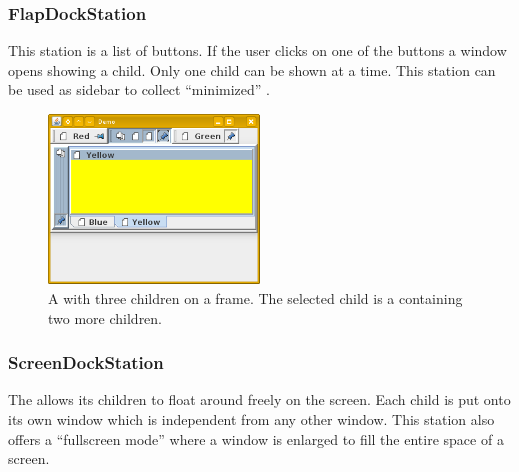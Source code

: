 \subsubsection{FlapDockStation}
This station is a list of buttons. If the user clicks on one of the buttons a window opens showing a child. Only one child can be shown at a time. This station can be used as sidebar to collect ``minimized'' . 

\begin{figure}[h!]
  \centering
    \includegraphics[width=0.5\textwidth]{basics/FlapDockStation}
  \caption{A  with three children on a frame. The selected child is a  containing two more children.}
\end{figure}


\subsubsection{ScreenDockStation}
The  allows its children to float around freely on the screen. Each child is put onto its own window which is independent from any other window. This station also offers a ``fullscreen mode'' where a window is enlarged to fill the entire space of a screen.


